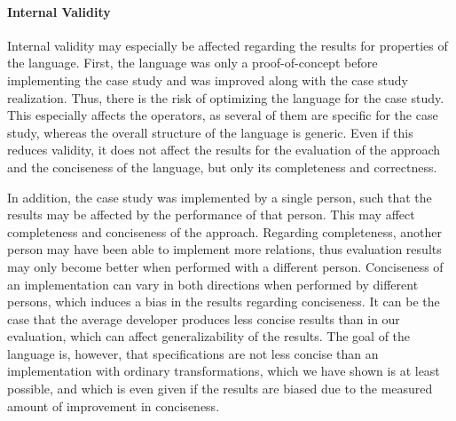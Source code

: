 

\paragraph{Internal Validity}
Internal validity may especially be affected regarding the results for properties of the \commonalities language.
First, the language was only a proof-of-concept before implementing the case study and was improved along with the case study realization.
Thus, there is the risk of optimizing the language for the case study.
This especially affects the operators, as several of them are specific for the case study, whereas the overall structure of the language is generic.
Even if this reduces validity, it does not affect the results for the evaluation of the \commonalities approach and the conciseness of the language, but only its completeness and correctness.

In addition, the case study was implemented by a single person, such that the results may be affected by the performance of that person.
This may affect completeness and conciseness of the approach.
Regarding completeness, another person may have been able to implement more relations, thus evaluation results may only become better when performed with a different person.
Conciseness of an implementation can vary in both directions when performed by different persons, which induces a bias in the results regarding conciseness.
It can be the case that the average developer produces less concise results than in our evaluation, which can affect generalizability of the results.
The goal of the language is, however, that specifications are not less concise than an implementation with ordinary transformations, which we have shown is at least possible, and which is even given if the results are biased due to the measured amount of improvement in conciseness.

